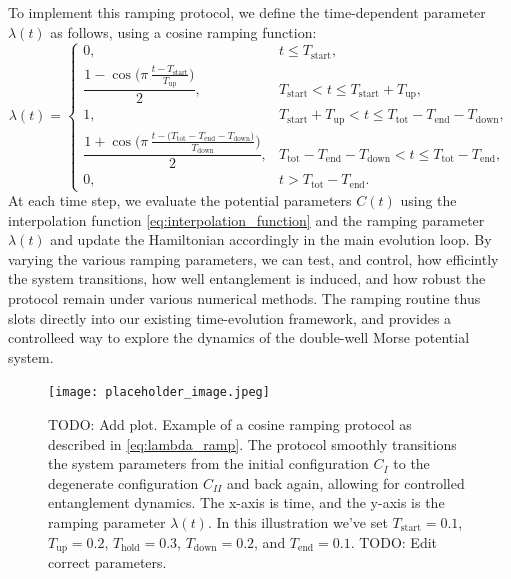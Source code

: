 \documentclass{subfiles}
\begin{document}
To implement this ramping protocol, we define the time-dependent parameter $\lambda(t)$ as follows, using a cosine ramping function:
\begin{equation*}
    \lambda(t) = \begin{cases}
0, &
t \le T_{\mathrm{start}}, \\[6pt]
\dfrac{1 - \cos\!\bigl(\pi \,\tfrac{t - T_{\mathrm{start}}}{T_{\mathrm{up}}}\bigr)}{2}, &
T_{\mathrm{start}} < t \le T_{\mathrm{start}} + T_{\mathrm{up}}, \\[8pt]
1, &
T_{\mathrm{start}} + T_{\mathrm{up}} < t \le T_{\mathrm{tot}} - T_{\mathrm{end}} - T_{\mathrm{down}}, \\[6pt]
\dfrac{1 + \cos\!\bigl(\pi \,\tfrac{t - \bigl(T_{\mathrm{tot}} - T_{\mathrm{end}} - T_{\mathrm{down}}\bigr)}{T_{\mathrm{down}}}\bigr)}{2}, &
T_{\mathrm{tot}} - T_{\mathrm{end}} - T_{\mathrm{down}} < t \le T_{\mathrm{tot}} - T_{\mathrm{end}}, \\[6pt]
0, &
t > T_{\mathrm{tot}} - T_{\mathrm{end}}.
\end{cases}
\label{eq:lambda_ramp}
\end{equation*}
At each time step, we evaluate the potential parameters $C(t)$ using the interpolation function \eqref{eq:interpolation_function} and the ramping parameter $\lambda(t)$ and update the Hamiltonian accordingly in the main evolution loop. By varying the various ramping parameters, we can test, and control, how efficintly the system transitions, how well entanglement is induced, and how robust the protocol remain under various numerical methods. The ramping routine thus slots directly into our existing time-evolution framework, and provides a controlleed way to explore the dynamics of the double-well Morse potential system.
\begin{figure}[h!]
    \centering
    \texttt{[image: placeholder\_image.jpeg]}
    \caption{TODO: Add plot. Example of a cosine ramping protocol as described in \eqref{eq:lambda_ramp}. The protocol smoothly transitions the system parameters from the initial configuration $C_I$ to the degenerate configuration $C_{II}$ and back again, allowing for controlled entanglement dynamics. The x-axis is time, and the y-axis is the ramping parameter $\lambda(t)$. In this illustration we've set $T_{\mathrm{start}} = 0.1$, $T_{\mathrm{up}} = 0.2$, $T_{\mathrm{hold}} = 0.3$, $T_{\mathrm{down}} = 0.2$, and $T_{\mathrm{end}} = 0.1$. TODO: Edit correct parameters.}
\end{figure}
\end{document}
